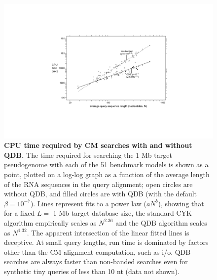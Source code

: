\begin{figure}
\begin{center}
\includegraphics[width=6.4in]{figs/speedup}
\caption{\textbf{CPU time required by CM searches with and without
    QDB.} The time required for searching the 1 Mb target pseudogenome
    with each of the 51 benchmark models is shown as a point, plotted
    on a log-log graph as a function of the average length of the RNA
    sequences in the query alignment; open circles are without QDB,
    and filled circles are with QDB (with the default $\beta = 
    10^{-7}$). Lines represent fits to a power law ($aN^b$), showing that
    for a fixed $L=$ 1 Mb target database size, the standard CYK
    algorithm empirically scales as $N^{2.36}$ and the QDB algorithm
    scales as $N^{1.32}$. The apparent intersection of the linear
    fitted lines is deceptive. At small query lengths,
    run time is dominated by factors other than the CM alignment
    computation, such as i/o. QDB searches are always faster
    than non-banded searches even for synthetic tiny
    queries of less than 10 nt (data not shown).}
\label{fig:speedup}
\end{center}
\end{figure}


